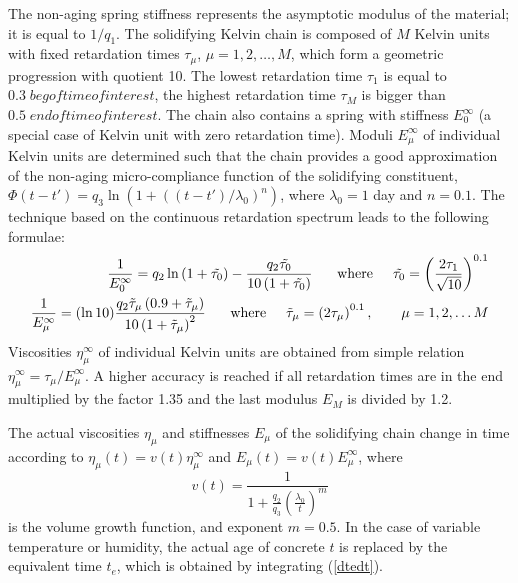 \documentclass[a4paper]{article}
\begin{document}
The non-aging spring stiffness represents the asymptotic modulus of the material; it is equal to $1/q_1$.
The solidifying Kelvin chain is composed of $M$ Kelvin units with fixed retardation times $\tau_{\mu}$, $\mu = 1, 2, \dots, M$, which form a geometric progression with quotient 10. The lowest retardation time $\tau_1$ is equal to $0.3\; begoftimeofinterest$, the highest retardation time $\tau_M$ is bigger than $0.5\; endoftimeofinterest$. The chain also contains a spring with stiffness $E_0^\infty$
(a special case of Kelvin unit with zero retardation time).
Moduli $E_{\mu}^\infty$ of individual Kelvin units are determined such that the chain
provides a good approximation of the non-aging micro-compliance function of the solidifying constituent, $\Phi(t-t') = q_3 \ln \left( 1 + \left( \left(t-t' \right)/\lambda_0 \right)^n \right)$, where $\lambda_0 = 1$ day and $n = 0.1$. 
The technique based on the continuous retardation spectrum
leads to the following formulae:
\begin{eqnarray}
 \frac{1}{E_0^\infty} = q_2 \ln\left(1+\tilde{\tau_0}\right) - \frac{q_2 \tilde{\tau_0} }{10 \left( 1 + \tilde{\tau_0} \right)} \hspace{5 mm} \mbox{ where} \hspace{5 mm} \tilde{\tau_0} = \left( \frac{2 \tau_1}{ \sqrt{10}}  \right)^{0.1} \\
\frac{1}{E_\mu^\infty} =  (\ln 10) \frac{q_2 \tilde{\tau}_\mu \left(0.9 + \tilde{\tau}_\mu \right)}{10 \left( 1 + \tilde{\tau}_\mu \right)^2} \hspace{5 mm} \mbox{ where} \hspace{5 mm} \tilde{\tau}_\mu = \left(2 \tau_\mu \right)^{0.1}, \hspace{7 mm} \mu = 1,2,\dots M
\end{eqnarray}
Viscosities $\eta_{\mu}^\infty$ of individual Kelvin units are obtained from simple relation $\eta_{\mu}^\infty=\tau_{\mu}/E_{\mu}^\infty$. A higher accuracy is reached if all retardation times are in the end multiplied by the factor 1.35 and the last modulus $E_M$ is divided by 1.2.

The actual viscosities $\eta_{\mu}$ and stiffnesses $E_{\mu}$ of the solidifying chain change in time according to $\eta_{\mu}(t) = v(t) \eta_{\mu}^\infty$ and $E_{\mu}(t) = v(t) E_{\mu}^\infty$, where 
\begin{equation}
v(t)= \frac{1}{1 + \frac{q_2}{q_3} \left( \frac{\lambda_0}{ t} \right)^m}
\end{equation}
is the volume growth function, and exponent $m = 0.5$. In the case of variable temperature or humidity, the actual age of concrete 
$t$ is replaced by the equivalent time $t_e$, which is obtained by integrating
(\ref{dtedt}).
\end{document}
